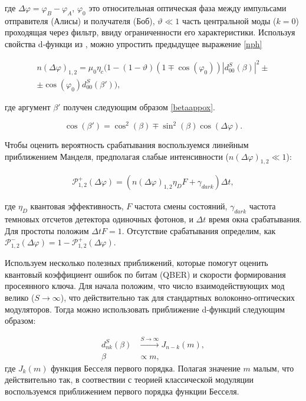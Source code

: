 где $\Delta\varphi=\varphi_B-\varphi_A$, $\varphi_0$ это относительная оптическая фаза между импульсами отправителя (Алисы) и получателя (Боб), $\vartheta \ll 1$ часть центральной моды ($k=0$) проходящая через фильтр, ввиду ограниченности его характеристики. Используя свойства d-функци из \cite{varshalovich1988quantum}, можно упростить предыдущее выражение \ref{nph}

\begin{align}
    n(\Delta\varphi)_{1,2}=\mu_0\eta_c\Big(1-(1-\vartheta)(1\mp\cos(\varphi_0))|d_{00}^{S}(\beta)|^2 \pm \nonumber \\
    \pm\cos(\varphi_0)d_{00}^{S}(\beta')\Big) \label{nph},
\end{align}

где аргумент $\beta'$ получен следующим образом \ref{betaappox}. 

\begin{equation} \label{betaappox}
    \cos(\beta')=\cos^2(\beta) \mp \sin^2(\beta)\cos(\Delta\varphi).
\end{equation}

Чтобы оценить вероятность срабатывания воспользуемся линейным приближением Манделя, предполагая слабые интенсивности ($n(\Delta\varphi)_{1,2} \ll 1$):

\begin{eqnarray}
    \mathcal{P}_{1,2}^{+}(\Delta\varphi)=\left(n(\Delta\varphi)_{1,2}\eta_DF+\gamma_{dark}\right)\Delta t, \label{pdet}
\end{eqnarray}

где $\eta_D$ квантовая эффективность, $F$ частота смены состояний, $\gamma_{dark}$ частота темновых отсчетов детектора одиночных фотонов, и $\Delta t$ время окна срабатывания. Для простоты положим $\Delta t F=1$. Отсутствие срабатывания определим, как $\mathcal{P}_{1,2}^{-}(\Delta\varphi)=1-\mathcal{P}_{1,2}^{+}(\Delta\varphi)$.     


Используем несколько полезных приближений, которые помогут оценить квантовый коэффициент ошибок по битам (QBER) и скорости формирования просеянного ключа. Для начала положим, что число взаимодействующих мод велико ($S\rightarrow \infty$), что действительно так для стандартных волоконно-оптических модуляторов. Тогда можно использовать приближение d-функций следующим образом:

\begin{align}
d_{nk}^S(\beta) &\xrightarrow{S\rightarrow \infty} J_{n-k}(m), \label{limdj} \\
\beta &\propto m, \label{propto}
\end{align}
где $J_k(m)$ функция Бесселя первого порядка. Полагая значение $m$ малым, что действительно так, в соотвествии с теорией классической модуляции воспользуемся приближением первого порядка функции Бесселя. 


